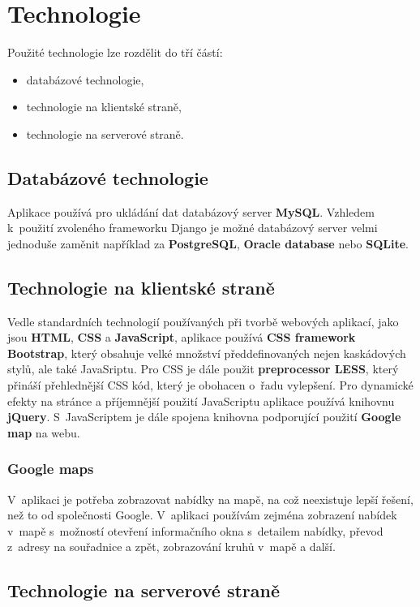 \section{Technologie}
Použité technologie lze rozdělit do tří částí:
\begin{itemize}
    \item databázové technologie,
    \item technologie na klientské straně,
    \item technologie na serverové straně.
\end{itemize}

\subsection{Databázové technologie}
Aplikace používá pro ukládání dat databázový server \textbf{MySQL}. Vzhledem k~použití zvoleného frameworku Django je možné databázový server velmi jednoduše zaměnit například za \textbf{PostgreSQL}, \textbf{Oracle database} nebo \textbf{SQLite}.

\subsection{Technologie na klientské straně}
Vedle standardních technologií používaných při tvorbě webových aplikací, jako jsou \textbf{HTML}, \textbf{CSS} a \textbf{JavaScript}, aplikace používá \textbf{CSS framework Bootstrap}, který obsahuje velké množství předdefinovaných nejen kaskádových stylů, ale také JavaSriptu. Pro CSS je dále použit \textbf{preprocessor LESS}, který přináší přehlednější CSS kód, který je obohacen o~řadu vylepšení. Pro dynamické efekty na stránce a příjemnější použití JavaScriptu aplikace používá knihovnu \textbf{jQuery}. S~JavaScriptem je dále spojena knihovna podporující použití \textbf{Google map} na webu.

\subsubsection{Google maps}
V~aplikaci je potřeba zobrazovat nabídky na mapě, na což neexistuje lepší řešení, než to od společnosti Google. V~aplikaci používám zejména zobrazení nabídek v~mapě s~možností otevření informačního okna s~detailem nabídky, převod z~adresy na souřadnice a zpět, zobrazování kruhů v~mapě a další.

\subsection{Technologie na serverové straně}
